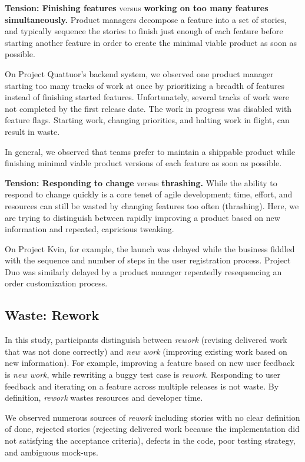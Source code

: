 \textbf{Tension: Finishing features} versus \textbf{working on too many features simultaneously.}
Product managers decompose a feature into a set of stories, and typically sequence the stories to finish just enough of each feature before starting another feature in order to create the minimal viable product as soon as possible. 


On Project Quattuor's backend system, we observed one product manager starting too many tracks of work at once by prioritizing a breadth of features instead of finishing started features. Unfortunately, several tracks of work were not completed by the first release date. The work in progress was disabled with feature flags. Starting work, changing priorities, and halting work in flight, can result in waste.


In general, we observed that teams prefer to maintain a shippable product while finishing minimal viable product versions of each feature as soon as possible.


\textbf{Tension: Responding to change} versus \textbf{thrashing.}
While the ability to respond to change quickly is a core tenet of agile development; time, effort, and resources can still be wasted by changing features too often (thrashing). Here, we are trying to distinguish between rapidly improving a product based on new information and repeated, capricious tweaking. 


On Project Kvin, for example, the launch was delayed while the business fiddled with the sequence and number of steps in the user registration process. Project Duo was similarly delayed by a product manager repeatedly resequencing an order customization process. 


\subsection{Waste: Rework}
In this study, participants distinguish between \textit{rework} (revising delivered work that was not done correctly) and \textit{new work} (improving existing work based on new information). For example, improving a feature based on new user feedback is \textit{new work}, while rewriting a buggy test case is \textit{rework}. Responding to user feedback and iterating on a feature across multiple releases is not waste. By definition, \textit{rework} wastes resources and developer time. 


We observed numerous sources of \textit{rework} including stories with no clear definition of done, rejected stories (rejecting delivered work because the implementation did not satisfying the  acceptance criteria), defects in the code, poor testing strategy, and ambiguous mock-ups.


